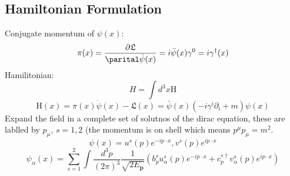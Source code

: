 \documentclass[12pt, a4paper, twoside, titlepage]{article}
\begin{document}
\begin{pmartix}
\subsection{Hamiltonian Formulation}
Conjugate momentum of $\psi(x)$:
$$
\pi(x) = \frac{\partial \mathfrak{L}}{\parital \dot \psi(x)} = i \bar \psi(x) \gamma^0 = i \gamma^{\dagger}(x)
$$
Hamilitonian:
$$
H = \int d^3 x \mathrm{H}
$$
$$
\mathrm{H}(x) =  \pi(x) \dot \psi(x) - \mathfrak{L}(x) = \bar \psi(x) (- i \gamma^i \partial_i + m) \psi(x)
$$
Expand the field in a complete set of solutnos of the dirac equation, these are lablled by $p_{\mu}$, $s=1,2$ (the momentum is on shell which means $p^{\mu}p_{\mu} = m^2$.
$$
\psi(x) = u^s (p) e^{-ip \cdot x}, v^s(p) e^{i p\cdot x}
$$
$$
\psi_{\alpha}(x) = \sum_{s=1}^2 \int \frac{d^3 p}{(2\pi)^3} \frac{1}{\sqrt{2 E_{\bm p}}} (b^s_p u_{\alpha}^s(p) e^{-i p\cdot x} + c^{s\dagger}_p v^s_{\alpha}(p)e^{i p\cdot x})
$$

\end{pmartix}
\end{document}
